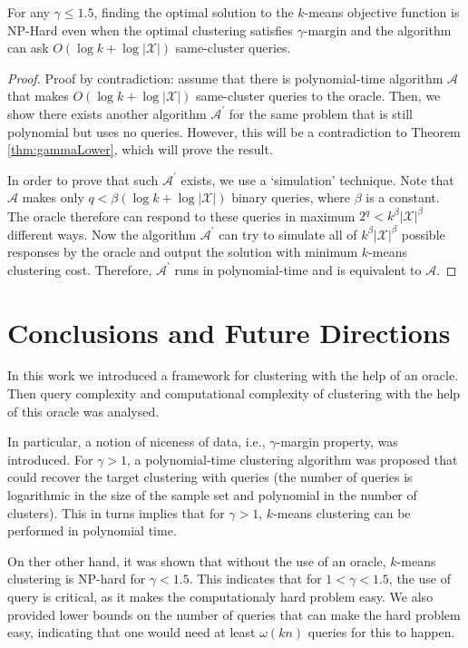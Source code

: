 \documentclass[orivec]{llncs}
\newcommand{\mc}{\mathcal}
\begin{document}
\begin{theorem}
\label{thm:queryLower}
For any $\gamma \le 1.5$, finding the optimal solution to the $k$-means objective function is NP-Hard even when the optimal clustering satisfies $\gamma$-margin and the algorithm can ask $O(\log k + \log |\mc X|)$ same-cluster queries.
\end{theorem}
\begin{proof}
Proof by contradiction: assume that there is polynomial-time algorithm $\mc A$ that makes $O(\log k + \log |\mc X|)$ same-cluster queries to the oracle. Then, we show there exists another algorithm $\mc A^\prime$ for the same problem that is still polynomial but uses no queries. However, this will be a contradiction to Theorem \ref{thm:gammaLower}, which will prove the result.

In order to prove that such $\mc A^\prime$ exists, we use a `simulation' technique. Note that $\mc A$ makes only $q<\beta(\log k + \log |\mc X|)$ binary queries, where $\beta$ is a constant. The oracle therefore can respond to these queries in maximum $2^{q} < k^\beta|\mc X|^\beta$ different ways. Now the algorithm $\mc A^\prime$ can try to simulate all of $k^\beta|\mc X|^\beta$ possible responses by the oracle and output the solution with minimum $k$-means clustering cost. Therefore, $\mc A^\prime$ runs in polynomial-time and is equivalent to $\mc A$.
\end{proof}


\section{Conclusions and Future Directions}
In this work we introduced a framework for clustering with the help of an oracle. Then query complexity and computational complexity of clustering with the help of this oracle was analysed. 

In particular, a notion of niceness of data, i.e., $\gamma$-margin property, was introduced. For $\gamma>1$, a polynomial-time clustering algorithm was proposed that could recover the target clustering with queries (the number of queries is logarithmic in the size of the sample set and polynomial in the number of clusters). This in turns implies that for $\gamma>1$, $k$-means clustering can be performed in polynomial time.

On ther other hand, it was shown that without the use of an oracle, $k$-means clustering is NP-hard for $\gamma < 1.5$. This indicates that for $1<\gamma<1.5$, the use of query is critical, as it makes the computationaly hard problem easy. We also provided lower bounds on the number of queries that can make the hard problem easy, indicating that one would need at least $\omega(kn)$ queries for this to happen.
\end{document}
